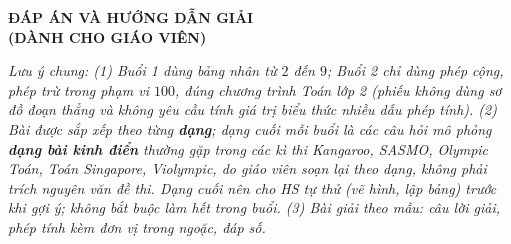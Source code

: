 \documentclass[../main.tex]{subfiles}
\begin{document}
\providecommand{\DAbai}{}\renewcommand{\DAbai}[1]{\par\smallskip\noindent{\color{mauchinh}\bfseries Bài #1.}\ }
\providecommand{\DAphan}{}\renewcommand{\DAphan}[1]{\par\medskip\noindent{\bfseries\color{orange!80!black}#1}\par\nopagebreak}
\providecommand{\DAgiai}{}\renewcommand{\DAgiai}[3]{\par\noindent\hspace*{0.6cm}\begin{minipage}[t]{15.5cm}\textit{Bài giải}\\ #1\\ \hspace*{0.8cm}#2\\ Đáp số: #3\end{minipage}\par}
\providecommand{\DAb}{}\renewcommand{\DAb}[2]{#1\\ \hspace*{0.8cm}#2\\ }
\providecommand{\DAnhieu}{}\renewcommand{\DAnhieu}[2]{\par\noindent\hspace*{0.6cm}\begin{minipage}[t]{15.5cm}\textit{Bài giải}\\ #1Đáp số: #2\end{minipage}\par}

\par\medskip
{\centering
        {\color{mauchinh!120}\bfseries\Large ĐÁP ÁN VÀ HƯỚNG DẪN GIẢI}\\[3pt]
        {\color{mauchinh!120}\bfseries\Large (DÀNH CHO GIÁO VIÊN)}\par}
\vspace{6pt}

\noindent\textit{Lưu ý chung: (1) Buổi 1 dùng bảng nhân từ $2$ đến $9$; Buổi 2 chỉ dùng phép cộng, phép trừ trong phạm vi $100$, đúng chương trình Toán lớp 2 (phiếu không dùng sơ đồ đoạn thẳng và không yêu cầu tính giá trị biểu thức nhiều dấu phép tính). (2) Bài được sắp xếp theo từng \textbf{dạng}; dạng cuối mỗi buổi là các câu hỏi mô phỏng \textbf{dạng bài kinh điển} thường gặp trong các kì thi Kangaroo, SASMO, Olympic Toán, Toán Singapore, Violympic, do giáo viên soạn lại theo dạng, không phải trích nguyên văn đề thi. Dạng cuối nên cho HS tự thử (vẽ hình, lập bảng) trước khi gợi ý; không bắt buộc làm hết trong buổi. (3) Bài giải theo mẫu: câu lời giải, phép tính kèm đơn vị trong ngoặc, đáp số.}
\end{document}
